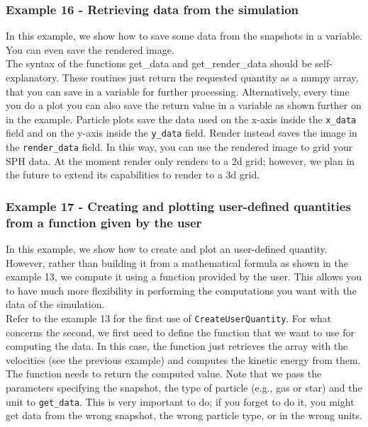\documentclass[a4paper]{article}
\begin{document}
\subsubsection{Example  16 - Retrieving data from the simulation}
In this example, we show how to save some data from the snapshots in a variable. You can even save the rendered image. \\








\noindent The syntax of the functions get\_data and get\_render\_data should be self-explanatory. These routines just return the requested quantity as a numpy array, that you can save in a variable for further processing. Alternatively, every time you do a plot you can also save the return value in a variable as shown further on in the example. Particle plots save the data used on the x-axis inside the \lstinline{x_data} field and on the y-axis inside the \lstinline{y_data} field. Render instead saves the image in the \lstinline{render_data} field. In this way, you can use the rendered image to grid your SPH data. At the moment render only renders to a 2d grid; however, we plan in the future to extend its capabilities to render to a 3d grid.

\subsubsection{Example  17 - Creating and plotting user-defined quantities from a function given by the user}
In this example, we show how to create and plot an user-defined quantity. However, rather than building it from a mathematical formula as shown in the example 13, we compute it using a function provided by the user. This allows you to have much more flexibility in performing the computations you want with the data of the simulation. \\








\noindent Refer to the example 13 for the first use of \lstinline{CreateUserQuantity}. For what concerns the second, we first need to define the function that we want to use for computing the data. In this case, the function just retrieves the array with the velocities (see the previous example) and computes the kinetic energy from them. The function needs to return the computed value. Note that we pass the parameters specifying the snapshot, the type of particle (e.g., gas or star) and the unit to \lstinline{get_data}. This is very important to do; if you forget to do it, you might get data from the wrong snapshot, the wrong particle type, or in the wrong units.
\end{document}
